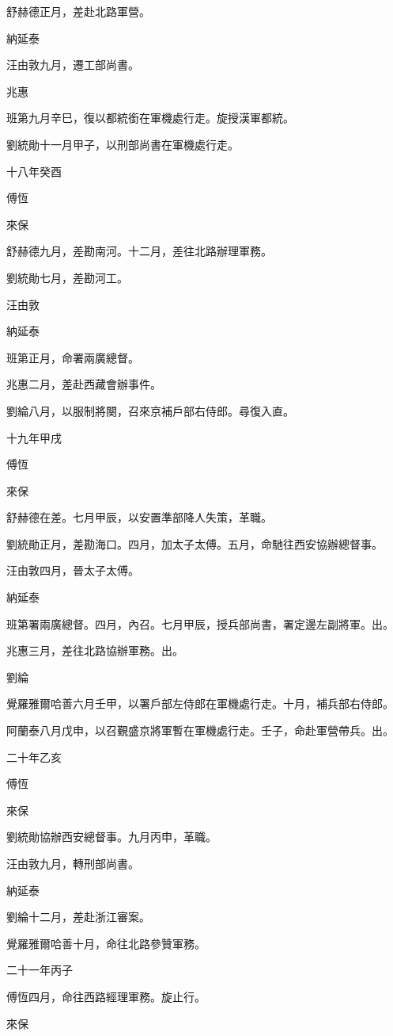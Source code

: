 \begin{pinyinscope}
舒赫德正月，差赴北路軍營。

納延泰

汪由敦九月，遷工部尚書。

兆惠

班第九月辛巳，復以都統銜在軍機處行走。旋授漢軍都統。

劉統勛十一月甲子，以刑部尚書在軍機處行走。

十八年癸酉

傅恆

來保

舒赫德九月，差勘南河。十二月，差往北路辦理軍務。

劉統勛七月，差勘河工。

汪由敦

納延泰

班第正月，命署兩廣總督。

兆惠二月，差赴西藏會辦事件。

劉綸八月，以服制將闋，召來京補戶部右侍郎。尋復入直。

十九年甲戌

傅恆

來保

舒赫德在差。七月甲辰，以安置準部降人失策，革職。

劉統勛正月，差勘海口。四月，加太子太傅。五月，命馳往西安協辦總督事。

汪由敦四月，晉太子太傅。

納延泰

班第署兩廣總督。四月，內召。七月甲辰，授兵部尚書，署定邊左副將軍。出。

兆惠三月，差往北路協辦軍務。出。

劉綸

覺羅雅爾哈善六月壬甲，以署戶部左侍郎在軍機處行走。十月，補兵部右侍郎。

阿蘭泰八月戊申，以召覲盛京將軍暫在軍機處行走。壬子，命赴軍營帶兵。出。

二十年乙亥

傅恆

來保

劉統勛協辦西安總督事。九月丙申，革職。

汪由敦九月，轉刑部尚書。

納延泰

劉綸十二月，差赴浙江審案。

覺羅雅爾哈善十月，命往北路參贊軍務。

二十一年丙子

傅恆四月，命往西路經理軍務。旋止行。

來保


\end{pinyinscope}
